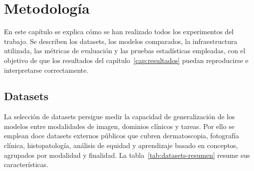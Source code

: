 
\chapter{Metodología}
\label{cap:metodos}

En este capítulo se explica cómo se han realizado todos los
experimentos del trabajo. Se describen los datasets, los modelos
comparados, la infraestructura utilizada, las métricas de evaluación
y las pruebas estadísticas empleadas, con el objetivo de que los
resultados del capítulo~\ref{cap:resultados} puedan reproducirse e
interpretarse correctamente.

\section{Datasets}
\label{sec:datos}

La selección de datasets persigue medir la capacidad de
generalización de los modelos entre modalidades de imagen, dominios
clínicos y tareas. Por ello se emplean doce datasets externos
públicos que cubren dermatoscopia, fotografía clínica,
histopatología, análisis de equidad y aprendizaje basado en
conceptos, agrupados por modalidad y finalidad. La
tabla~\ref{tab:datasets-resumen} resume sus características.

